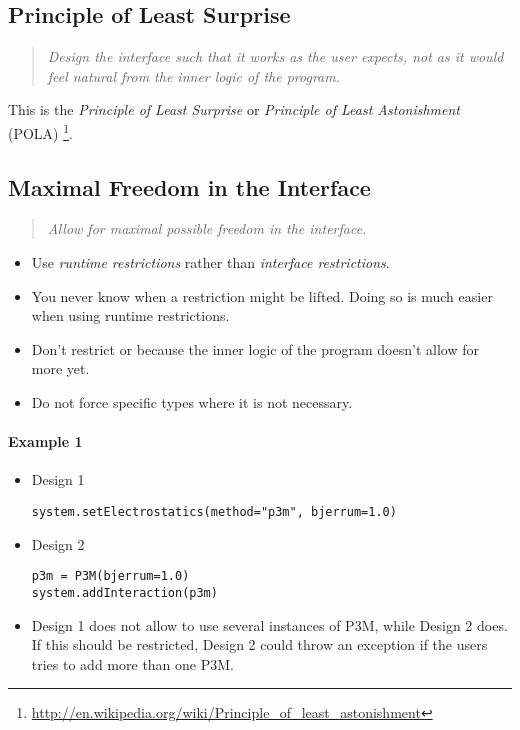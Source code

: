 \documentclass[
a4paper,                        %
11pt,                           %
]{scrartcl}
\newenvironment{designrule}{\begin{quote}\itshape}{\end{quote}}
\begin{document}
\subsection{Principle of Least Surprise}

\begin{designrule}
  Design the interface such that it works as the user expects, not as
  it would feel natural from the inner logic of the program.
\end{designrule}


This is the \emph{Principle of Least Surprise} or \emph{Principle of
  Least Astonishment} (POLA)
\footnote{\url{http://en.wikipedia.org/wiki/Principle_of_least_astonishment}}.

\subsection{Maximal Freedom in the Interface}

\begin{designrule}
  Allow for maximal possible freedom in the interface.
\end{designrule}

\begin{itemize}
\item Use \emph{runtime restrictions} rather than \emph{interface
    restrictions}.
\item You never know when a restriction might be lifted. Doing so is
  much easier when using runtime restrictions.
\item Don't restrict or because the inner logic of the program
  doesn't allow for more yet.
\item Do not force specific types where it is not necessary.
\end{itemize}

\paragraph{Example 1}

\begin{itemize}
\item Design 1
\begin{verbatim}
system.setElectrostatics(method="p3m", bjerrum=1.0)
\end{verbatim}

\item Design 2
\begin{verbatim}
p3m = P3M(bjerrum=1.0)
system.addInteraction(p3m)
\end{verbatim}

\item Design 1 does not allow to use several instances of P3M, while
  Design 2 does. If this should be restricted, Design 2 could throw an
  exception if the users tries to add more than one P3M.
\end{itemize}
\end{document}
